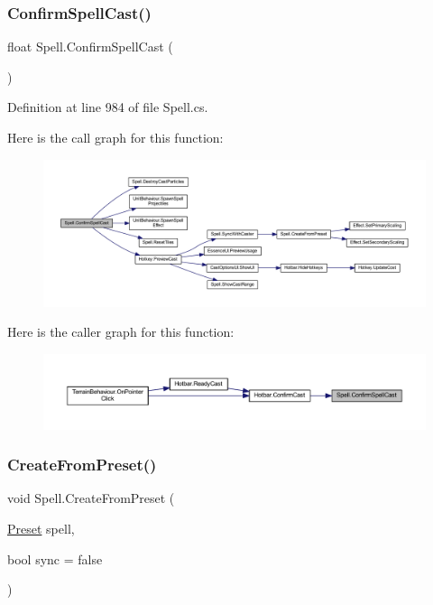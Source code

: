 \subsubsection{\texorpdfstring{ConfirmSpellCast()}{ConfirmSpellCast()}}
{\footnotesize\ttfamily float Spell.\+Confirm\+Spell\+Cast (\begin{DoxyParamCaption}{ }\end{DoxyParamCaption})}



Definition at line 984 of file Spell.\+cs.

Here is the call graph for this function\+:
\nopagebreak
\begin{figure}[H]
\begin{center}
\leavevmode
\includegraphics[width=350pt]{class_spell_a89146285dc4dadf46398da2683bcc869_cgraph}
\end{center}
\end{figure}
Here is the caller graph for this function\+:
\nopagebreak
\begin{figure}[H]
\begin{center}
\leavevmode
\includegraphics[width=350pt]{class_spell_a89146285dc4dadf46398da2683bcc869_icgraph}
\end{center}
\end{figure}
\mbox{\label{class_spell_aee08370358e033af2bf7e0c4c2f2b2bd}} 
\subsubsection{\texorpdfstring{CreateFromPreset()}{CreateFromPreset()}}
{\footnotesize\ttfamily void Spell.\+Create\+From\+Preset (\begin{DoxyParamCaption}\item[{\mbox{\hyperlink{class_spell_a5520e850e7000a6156b3456672b72ed1}{Preset}}}]{spell,  }\item[{bool}]{sync = {\ttfamily false} }\end{DoxyParamCaption})}



